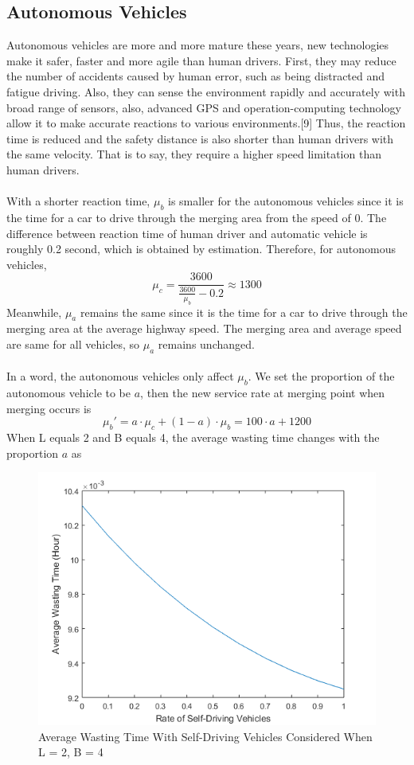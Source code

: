 \subsection{Autonomous Vehicles}
Autonomous vehicles are more and more mature these years, new technologies make it safer, faster and more agile than human drivers. First, they may reduce the number of accidents caused by human error, such as being distracted and fatigue driving. Also, they can sense the environment rapidly and accurately with broad range of sensors, also, advanced GPS and operation-computing technology allow it to make accurate reactions to various environments.[9] Thus, the reaction time is reduced and the safety distance is also shorter than human drivers with the same velocity. That is to say, they require a higher speed limitation than human drivers.\\
\\
With a shorter reaction time, $\mu_{b}$ is smaller for the autonomous vehicles since it is the time for a car to drive through the merging area from the speed of 0. The difference between reaction time of human driver and automatic vehicle is roughly 0.2 second, which is obtained by estimation. Therefore, for autonomous vehicles,\\
\[
\mu_{c} = \frac{3600}{\frac{3600}{\mu_{b}} - 0.2} \approx 1300
\]
Meanwhile, $\mu_{a}$ remains the same since it is the time for a car to drive through the merging area at the average highway speed. The merging area and average speed are same for all vehicles, so $\mu_{a}$ remains unchanged.\\
\\
In a word, the autonomous vehicles only affect $\mu_{b}$. We set the proportion of the autonomous vehicle to be $a$, then the new service rate at merging point when merging occurs is\\
\[
\mu_{b}\prime = a\cdot\mu_{c} + (1-a)\cdot\mu_{b} = 100\cdot a + 1200
\]
When L equals 2 and B equals 4, the average wasting time changes with the proportion $a$ as\\
\begin{figure}[h]
\small
\centering
\includegraphics[width=12cm]{avg_sd.png}
\caption{Average Wasting Time With Self-Driving Vehicles Considered When L = 2, B = 4} \label{fig: Average Wasting Time With Self-Driving Vehicles Considered When L = 2, B = 4}
\end{figure}

